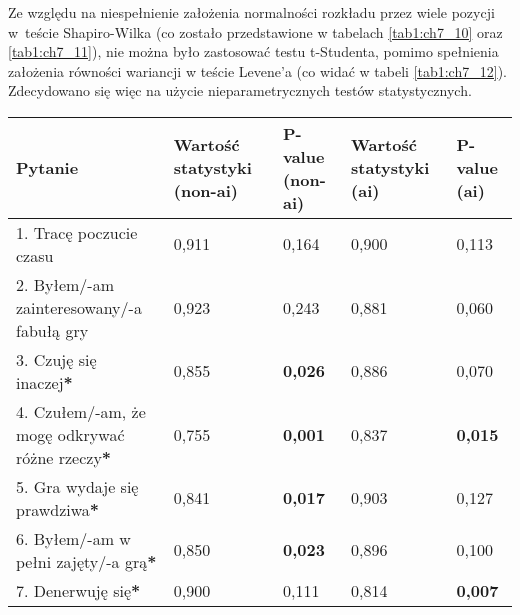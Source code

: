 Ze względu na niespełnienie założenia normalności rozkładu przez wiele pozycji w~teście Shapiro-Wilka (co zostało
przedstawione w tabelach \ref{tab1:ch7_10} oraz \ref{tab1:ch7_11}), nie można było zastosować testu t-Studenta,
pomimo spełnienia założenia równości wariancji w teście Levene'a (co widać w tabeli \ref{tab1:ch7_12}). Zdecydowano
się więc na użycie nieparametrycznych testów statystycznych.

\newpage

\begin{table}[!h]
    \begin{center}
        \begin{tabular}{|m{10em}|m{5em}|m{5em}|m{5em}|m{5em}|}
            \hline
            Pytanie                                                                     & Wartość statystyki (non-\gls{ai}) & P-value (non-\gls{ai}) & Wartość statystyki (\gls{ai}) & P-value (\gls{ai}) \\
            \hline
            1. Tracę poczucie czasu                                                     & 0,911                             & 0,164                  & 0,900                         & 0,113              \\
            2. Byłem/-am \newline zainteresowany/-a fabułą gry                          & 0,923                             & 0,243                  & 0,881                         & 0,060              \\
            3. Czuję się inaczej\textbf{*}                                              & 0,855                             & \textbf{0,026}         & 0,886                         & 0,070              \\
            4. Czułem/-am, że mogę odkrywać różne rzeczy\textbf{*}                      & 0,755                             & \textbf{0,001}         & 0,837                         & \textbf{0,015}     \\
            5. Gra wydaje się prawdziwa\textbf{*}                                       & 0,841                             & \textbf{0,017}         & 0,903                         & 0,127              \\
            6. Byłem/-am \newline w pełni zajęty/-a grą\textbf{*}                       & 0,850                             & \textbf{0,023}         & 0,896                         & 0,100              \\
            7. Denerwuję się\textbf{*}                                                  & 0,900                             & 0,111                  & 0,814                         & \textbf{0,007}     \\

\end{tabular}
\end{center}
\end{table}
